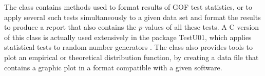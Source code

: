 The class 
contains methods used to format results of GOF
test statistics, or to apply several such tests simultaneously to a
given data set and format the results to produce a report that also
contains the $p$-values of all these tests.
A C version of this class is actually used extensively in the package
TestU01, which applies statistical tests to random number generators
\cite{iLEC01t}.
The class also provides tools to plot an empirical or
theoretical distribution function, by creating a data file that
contains a graphic plot in a format compatible with a given software.


